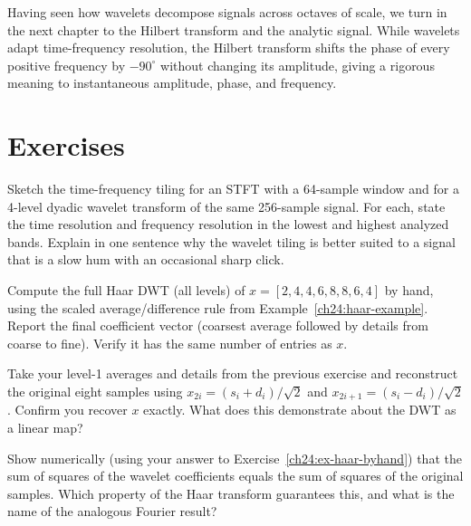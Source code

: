 Having seen how wavelets decompose signals across octaves of scale, we turn in the next
chapter to the Hilbert transform and the analytic signal. While wavelets adapt time-frequency
resolution, the Hilbert transform shifts the phase of every positive frequency by
$-90^\circ$ without changing its amplitude, giving a rigorous meaning to instantaneous
amplitude, phase, and frequency.

\section{Exercises}
\label{ch24:exercises}

\begin{exercise}
\label{ch24:ex-tiling}
Sketch the time-frequency tiling for an STFT with a 64-sample window and for a
4-level dyadic wavelet transform of the same 256-sample signal. For each, state
the time resolution and frequency resolution in the lowest and highest analyzed
bands. Explain in one sentence why the wavelet tiling is better suited to a signal
that is a slow hum with an occasional sharp click.
\end{exercise}

\begin{exercise}
\label{ch24:ex-haar-byhand}
Compute the full Haar DWT (all levels) of $x = [2, 4, 4, 6, 8, 8, 6, 4]$ by hand,
using the scaled average/difference rule from Example~\ref{ch24:haar-example}.
Report the final coefficient vector (coarsest average followed by details from
coarse to fine). Verify it has the same number of entries as $x$.
\end{exercise}

\begin{exercise}
\label{ch24:ex-invert}
Take your level-1 averages and details from the previous exercise and reconstruct
the original eight samples using $x_{2i} = (s_i+d_i)/\sqrt2$ and
$x_{2i+1} = (s_i-d_i)/\sqrt2$. Confirm you recover $x$ exactly. What does this
demonstrate about the DWT as a linear map?
\end{exercise}

\begin{exercise}
\label{ch24:ex-energy}
Show numerically (using your answer to Exercise~\ref{ch24:ex-haar-byhand}) that
the sum of squares of the wavelet coefficients equals the sum of squares of the
original samples. Which property of the Haar transform guarantees this, and what
is the name of the analogous Fourier result?
\end{exercise}

